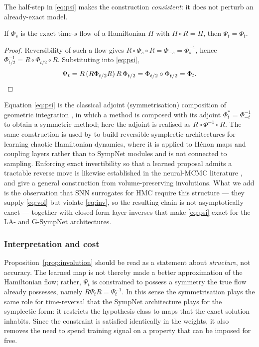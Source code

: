 The half-step in \eqref{eq:psi} makes the construction \emph{consistent}: it
does not perturb an already-exact model.

\begin{lemma}
\label{lem:consistency}
If $\Phi_s$ is the exact time-$s$ flow of a Hamiltonian $H$ with $H \circ R = H$,
then $\Psi_t = \Phi_t$.
\end{lemma}

\begin{proof}
Reversibility of such a flow gives $R \circ \Phi_s \circ R = \Phi_{-s} = \Phi_s^{-1}$,
hence $\Phi_{t/2}^{-1} = R \circ \Phi_{t/2} \circ R$. Substituting into
\eqref{eq:psi},
\begin{equation*}
    \Psi_t = R \,(R \Phi_{t/2} R)\, R\, \Phi_{t/2}
           = \Phi_{t/2} \circ \Phi_{t/2} = \Phi_t . \qedhere
\end{equation*}
\end{proof}

Equation \eqref{eq:psi} is the classical adjoint (symmetrisation) composition
of geometric integration \cite{HairerLubichWanner}, in which a method is
composed with its adjoint $\Phi^{*}_t = \Phi_{-t}^{-1}$ to obtain a symmetric
method; here the adjoint is realised as $R \circ \Phi^{-1} \circ R$. The same
construction is used by \cite{valperga2022reversible} to build reversible
symplectic architectures for learning chaotic Hamiltonian dynamics, where it is
applied to H\'enon maps and coupling layers rather than to SympNet modules and
is not connected to sampling. Enforcing exact invertibility so that a learned
proposal admits a tractable reverse move is likewise established in the
neural-MCMC literature \cite{song2017nice, levy2018generalizing}, and
\cite{spanbauer2020involutive} give a general construction from
volume-preserving involutions. What we add is the observation that SNN
surrogates for HMC require this structure --- they supply \eqref{eq:vol} but
violate \eqref{eq:inv}, so the resulting chain is not asymptotically exact ---
together with closed-form layer inverses that make \eqref{eq:psi} exact for the
LA- and G-SympNet architectures.

\subsubsection{Interpretation and cost}

Proposition~\ref{prop:involution} should be read as a statement about
\emph{structure}, not accuracy. The learned map is not thereby made a better
approximation of the Hamiltonian flow; rather, $\Psi_t$ is constrained to
possess a symmetry the true flow already possesses, namely
$R \Psi_t R = \Psi_t^{-1}$. In this sense the symmetrisation plays the same
role for time-reversal that the SympNet architecture plays for the symplectic
form: it restricts the hypothesis class to maps that the exact solution
inhabits. Since the constraint is satisfied identically in the weights, it
also removes the need to spend training signal on a property that can be
imposed for free.

